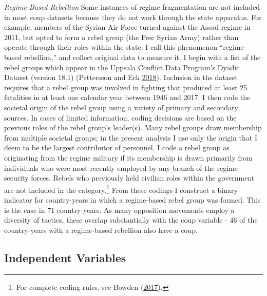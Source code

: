 \documentclass[12pt,]{article}
\let\rmarkdownfootnote\footnote%
\def\footnote{\protect\rmarkdownfootnote}
\theoremstyle{definition}
\theoremstyle{definition}
\theoremstyle{definition}
\theoremstyle{remark}
\begin{document}
\emph{Regime-Based Rebellion} Some instances of regime fragmentation are
not included in most coup datasets because they do not work through the
state apparatus. For example, members of the Syrian Air Force turned
against the Assad regime in 2011, but opted to form a rebel group (the
Free Syrian Army) rather than operate through their roles within the
state. I call this phenomenon ``regime-based rebellion,'' and collect
original data to measure it. I begin with a list of the rebel groups
which appear in the Uppsala Conflict Data Program's Dyadic Dataset
(version 18.1) (Pettersson and Eck
\protect\hyperlink{ref-Pettersson2018}{2018}). Inclusion in the dataset
requires that a rebel group was involved in fighting that produced at
least 25 fatalities in at least one calendar year between 1946 and 2017.
I then code the societal origin of the rebel group using a variety of
primary and secondary sources. In cases of limited information, coding
decisions are based on the previous roles of the rebel group's
leader(s). Many rebel groups draw membership from multiple societal
groups; in the present analysis I use only the origin that I deem to be
the largest contributor of personnel. I code a rebel group as
originating from the regime military if its membership is drawn
primarily from individuals who were most recently employed by any branch
of the regime security forces. Rebels who previously held civilian roles
within the government are not included in the category.\footnote{For
  complete coding rules, see Bowden
  (\protect\hyperlink{ref-Bowden2017}{2017}).} From these codings I
construct a binary indicator for country-years in which a regime-based
rebel group was formed. This is the case in 71 country-years. As many
opposition movements employ a diversity of tactics, these overlap
substantially with the coup variable - 46 of the country-years with a
regime-based rebellion also have a coup.

\hypertarget{independent-variables}{%
\subsection{Independent Variables}\label{independent-variables}}
\end{document}

